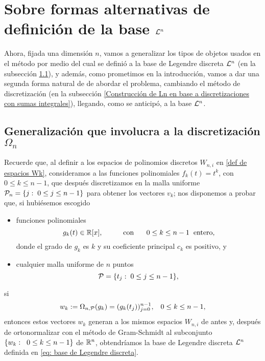 \section{Sobre formas alternativas de definición de la base $\mathcal{L}^{n}$}

Ahora,
fijada una dimensión $n$,
vamos a generalizar los tipos de objetos
usados
en el método por medio del cual
se definió a la base de Legendre discreta $\mathcal{L}^{n}$
(en la subsección 
\ref{Generalización que involucra a la discretización Omega n}),
y además, como prometimos en la introducción,
vamos a dar una segunda forma natural de
de abordar el problema, cambiando el método de 
discretización
(en la subsección 
\ref{Construcción de Ln en base a discretizaciones con sumas integrales}),
llegando, como se anticipó, a la base
$\mathcal{L}^{n}$.

\subsection{Generalización que involucra a la discretización $\Omega_{n}$}
\label{Generalización que involucra a la discretización Omega n}

Recuerde que, al definir a los espacios
de polinomios discretos
$W_{n,i}$ en \eqref{def de espacios Wk},
consideramos a
las funciones polinomiales 
$f_{k}(t)=t^{k}$, con $0 \leq k \leq n-1$, que después
discretizamos en la malla uniforme
$\mathcal{P}_{n}= \{ j: \hspace{0.1cm} 0 \leq j \leq n-1 \} $
para obtener los vectores $v_{k}$; nos
disponemos a probar que, si hubiésemos escogido
\begin{itemize}
\item funciones polinomiales
\[
g_{k}(t) \in \mathbb{R}[x], \hspace{1cm} 
\text{con }\hspace{0.5cm} 0 \leq k \leq n-1 \hspace{0.2cm} \text{entero},
\]
donde
el grado de $g_{k}$ es $k$ y su coeficiente principal 
$c_{k}$ es positivo, y

\item cualquier malla uniforme de $n$ puntos
\[
\mathcal{P}=\{t_{j} : \hspace{0.1cm} 0 \leq j \leq n-1 \},
\]
\end{itemize}
si 
\begin{equation}
\label{eq1: 31Oct}
w_{k} := \Omega_{n,\mathcal{P}}(g_{k})
=(g_{k}(t_{j}))_{j=0}^{n-1}, \hspace{0.3cm} 0 \leq k \leq n-1,
\end{equation}
entonces estos vectores $w_{k}$
generan a los mismos espacios $W_{n,i}$
de antes y,
después de ortonormalizar con el 
método de Gram-Schmidt
al subconjunto $\{w_{k}: \hspace{0.2cm} 0 \leq k \leq n-1\}$
de $\mathbb{R}^{n}$, obtendríamos la 
base de Legendre discreta $\mathcal{L}^{n}$ 
definida en \eqref{eq: base de Legendre discreta}. 


